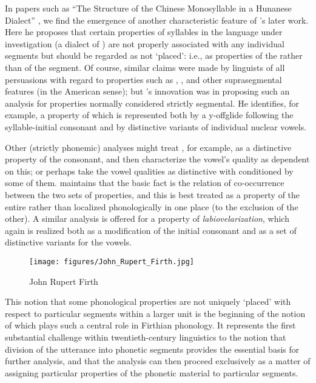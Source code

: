 In papers such as ``The Structure of the {Chinese} Monosyllable in a
Hunanese Dialect'' \citep{firth.rogers37:hunanese}, we find the
emergence of another characteristic feature of {\Firth}'s later
work. Here he proposes that certain properties of syllables in the
language under investigation (a dialect of ) are not properly
associated with any individual segments but should be regarded as not
`placed': i.e., as properties of the  rather than of the
segment. Of course, similar claims were made by linguists of all
persuasions with regard to properties such as , , and other
suprasegmental features (in the American sense); but {\Firth}'s
innovation was in proposing such an analysis for properties normally
considered strictly segmental. He identifies, for example, a property
of  which is represented both by a y-offglide following the
syllable-initial consonant and by distinctive variants of individual
nuclear vowels.

Other (strictly phonemic) analyses might treat , for
example, as a distinctive property of the consonant, and then
characterize the vowel's quality as dependent on this; or perhaps take
the vowel qualities as distinctive with  conditioned by
some of them. {\Firth} maintains that the basic fact is the relation of
co-occurrence between the two sets of properties, and this is best
treated as a property of the entire  rather than localized
phonologically in one place (to the exclusion of the other). A similar
analysis is offered for a property of \emph{labiovelarization}, which again
is realized both as a modification of the initial consonant and as a
set of distinctive variants for the vowels.

\begin{wrapfigure}{l}{.4\textwidth}
  \texttt{[image: figures/John\_Rupert\_Firth.jpg]}
  \caption{John Rupert Firth}
  \label{fig:ch.firth.firth_wiki}
\end{wrapfigure}
This notion that some phonological properties are not uniquely
`placed' with respect to particular segments within a larger unit is
the beginning of the notion of \emph{} which plays such a central role
in Firthian phonology. It represents the first substantial challenge
within twentieth-century linguistics to the notion that division of
the utterance into phonetic segments provides the essential basis for
further analysis, and that the analysis can then proceed exclusively
as a matter of assigning particular properties of the phonetic
material to particular segments.

